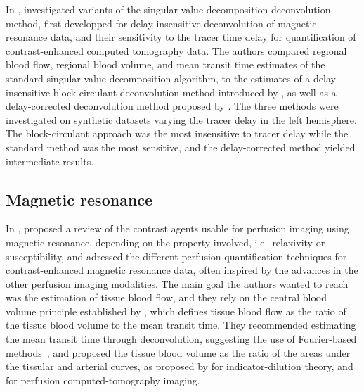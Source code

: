 In \citeyear{Kudo:2009hy}, \citet{Kudo:2009hy} investigated variants of the singular value decomposition deconvolution method, first developped for delay-insensitive deconvolution of magnetic resonance data, and their sensitivity to the tracer time delay for quantification of contrast-enhanced computed tomography data. 
The authors compared regional blood flow, regional blood volume, and mean transit time estimates of the standard singular value decomposition algorithm, to the estimates of a delay-insensitive block-circulant deconvolution method introduced by \citet{Wu:2003du}, as well as a delay-corrected deconvolution method proposed by \citet{Ibaraki:2005fn}.
The three methods were investigated on synthetic datasets varying the tracer delay in the left hemisphere.
The block-circulant approach was the most insensitive to tracer delay while the standard method was the most sensitive, and the delay-corrected method yielded intermediate results.

\subsection{Magnetic resonance}
In \citeyear{Rosen:1990hz}, \citet{Rosen:1990hz} proposed a review of the contrast agents usable for perfusion imaging using magnetic resonance, depending on the property involved, i.e.~relaxivity or susceptibility, and adressed the different perfusion quantification techniques for contrast-enhanced magnetic resonance data, often inspired by the advances in the other perfusion imaging modalities.
The main goal the authors wanted to reach was the estimation of tissue blood flow, and they rely on the central blood volume principle established by \citet{Stewart:1897dz}, which defines tissue blood flow as the ratio of the tissue blood volume to the mean transit time.
They recommended estimating the mean transit time through deconvolution, suggesting the use of Fourier-based methods~\cite{Coulam:1966un}, and proposed the tissue blood volume as the ratio of the areas under the tissular and arterial curves, as proposed by \citet{Lassen:1979vj} for indicator-dilution theory, and \citet{Axel:1980jg} for perfusion computed-tomography imaging.

